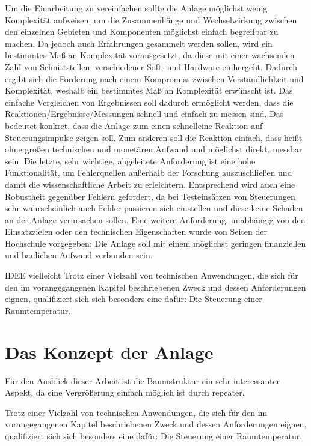 Um die Einarbeitung zu vereinfachen sollte die Anlage möglichst wenig Komplexität aufweisen, um die Zusammenhänge und Wechselwirkung zwischen den einzelnen Gebieten und Komponenten möglichst einfach begreifbar zu machen. Da jedoch auch Erfahrungen gesammelt werden sollen, wird ein bestimmtes Maß an Komplexität vorausgesetzt, da diese mit einer wachsenden Zahl von Schnittstellen, verschiedener Soft- und Hardware einhergeht. Dadurch ergibt sich die Forderung nach einem Kompromiss zwischen Verständlichkeit und Komplexität, weshalb ein bestimmtes Maß an Komplexität erwünscht ist.
Das einfache Vergleichen von Ergebnissen soll dadurch ermöglicht werden, dass die Reaktionen/Ergebnisse/Messungen schnell und einfach zu messen sind. Das bedeutet konkret, dass die Anlage zum einen \Gun schnell\Gob eine Reaktion auf Steuerungsimpulse zeigen soll. Zum anderen soll die Reaktion einfach, dass heißt ohne großen technischen und monetären Aufwand und möglichst direkt, messbar sein. Die letzte, sehr wichtige, abgeleitete Anforderung ist eine hohe Funktionalität, um Fehlerquellen außerhalb der Forschung auszuschließen und damit die wissenschaftliche Arbeit zu erleichtern. Entsprechend wird auch eine Robustheit gegenüber Fehlern gefordert, da bei Testeinsätzen von Steuerungen sehr wahrscheinlich auch Fehler passieren sich einstellen und diese keine Schaden an der Anlage verursachen sollen.
Eine weitere Anforderung, unabhängig von den Einsatzzielen oder den technischen Eigenschaften wurde von Seiten der Hochschule vorgegeben: Die Anlage soll mit einem möglichst geringen finanziellen und baulichen Aufwand verbunden sein.


IDEE vielleicht
Trotz einer Vielzahl von technischen Anwendungen, die sich für den im vorangegangenen Kapitel beschriebenen Zweck und dessen Anforderungen eignen, qualifiziert sich  sich besonders eine dafür: Die Steuerung einer Raumtemperatur.


\section{Das Konzept der Anlage}

 Für den Ausblick dieser Arbeit ist die Baumstruktur ein sehr interessanter Aspekt, da eine Vergrößerung einfach möglich ist durch repeater.


Trotz einer Vielzahl von technischen Anwendungen, die sich für den im vorangegangenen Kapitel beschriebenen Zweck und dessen Anforderungen eignen, qualifiziert sich  sich besonders eine dafür: Die Steuerung einer Raumtemperatur.


